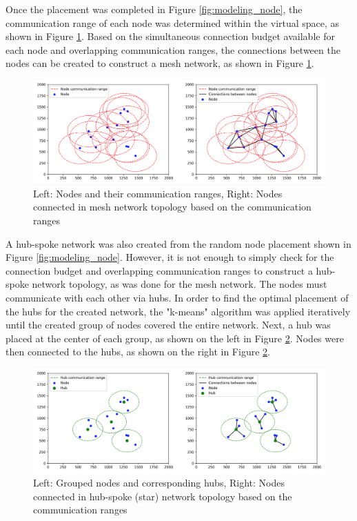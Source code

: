 Once the placement was completed in Figure \ref{fig:modeling_node}, the communication range of each node was determined within the virtual space, as shown in Figure \ref{fig:modeling_mesh}. Based on the simultaneous connection budget available for each node and overlapping communication ranges, the connections between the nodes can be created to construct a mesh network, as shown in Figure \ref{fig:modeling_mesh}.

\begin{figure}[H]
    \centering
    \includegraphics[width=0.94\columnwidth]{final-proposal/images/modeling_mesh.png}
    \caption{Left: Nodes and their communication ranges, Right: Nodes connected in mesh network topology based on the communication ranges}
    \label{fig:modeling_mesh}
\end{figure}

A hub-spoke network was also created from the random node placement shown in Figure \ref{fig:modeling_node}. However, it is not enough to simply check for the connection budget and overlapping communication ranges to construct a hub-spoke network topology, as was done for the mesh network. The nodes must communicate with each other via hubs. In order to find the optimal placement of the hubs for the created network, the "k-means" algorithm was applied iteratively until the created group of nodes covered the entire network. Next, a hub was placed at the center of each group, as shown on the left in Figure \ref{fig:modeling_star}. Nodes were then connected to the hubs, as shown on the right in Figure \ref{fig:modeling_star}.

\begin{figure}[H]
    \centering
    \includegraphics[width=0.94\columnwidth]{final-proposal/images/modeling_star.png}
    \caption{Left: Grouped nodes and corresponding hubs, Right: Nodes connected in hub-spoke (star) network topology based on the communication ranges}
    \label{fig:modeling_star}
\end{figure}

